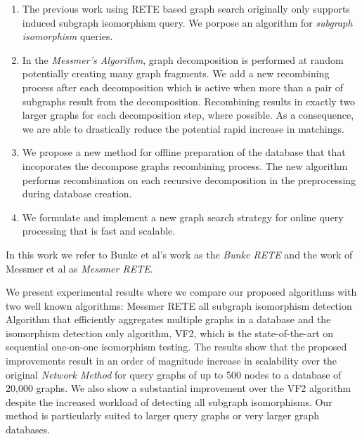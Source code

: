 \begin{enumerate}
\item The previous work using RETE based graph search originally only supports induced subgraph isomorphism query. We porpose an algorithm for \textit{subgraph isomorphism} queries.
\item  In the \textit{Messmer's Algorithm}, graph decomposition is performed at random potentially creating many graph fragments. We add a new recombining 
process after each decomposition which is active when more than a pair of  subgraphs result from the decomposition.  Recombining results in exactly two larger 
graphs for each decomposition step, where possible.  As a consequence, we are able to drastically reduce the potential rapid increase in matchings. 
\item We propose a new method for offline preparation of the database that that incoporates  the decompose graphs recombining process. The new algorithm performs recombination 
on  each recursive decomposition in the  preprocessing during database creation. 
\item We formulate and implement a new graph search strategy for online query processing that is fast and scalable.

\end{enumerate}

In this work we refer to Bunke et al's work as the \textit{Bunke RETE} \cite{bunke_glauser_tran1991} and the work of Messmer et al\cite{messmer_bunke2000} as \textit{Messmer RETE}.


We present experimental results where we compare our proposed algorithms with two well known algorithms: Messmer RETE \cite{messmer_bunke2000} all subgraph isomorphism 
detection Algorithm that efficiently aggregates multiple graphs in a database and the isomorphism detection only algorithm, VF2\cite{cordella2001_vf2}, which is the 
state-of-the-art on sequential one-on-one isomorphism testing. The results show that the proposed improvements result in an order of magnitude increase in scalability 
over the original \textit{Network Method}  for query graphs of up to 500 nodes to a database of 20,000 graphs. We also show a substantial improvement over the VF2 
algorithm despite the increased workload of detecting all subgraph isomorphisms. Our method is particularly suited to larger query graphs or very larger graph 
databases.
